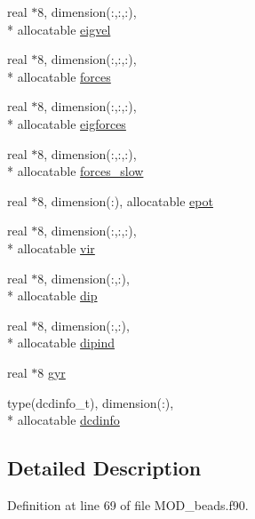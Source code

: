 \begin{DoxyCompactItemize}
\item 
real $\ast$8, dimension(\-:,\-:,\-:), \\*
allocatable \hyperlink{structbeads_1_1polymer__comm__type_a5b453aa1870a35c3b1ce3e84b8e2c6cb}{eigvel}
\item 
real $\ast$8, dimension(\-:,\-:,\-:), \\*
allocatable \hyperlink{structbeads_1_1polymer__comm__type_af9ab777fc9978966562ec6660fcf6eb3}{forces}
\item 
real $\ast$8, dimension(\-:,\-:,\-:), \\*
allocatable \hyperlink{structbeads_1_1polymer__comm__type_a8443614cb5015e9983dd6a6a8b8d730c}{eigforces}
\item 
real $\ast$8, dimension(\-:,\-:,\-:), \\*
allocatable \hyperlink{structbeads_1_1polymer__comm__type_a6614d7b1d87de7ddf82f98702d1d8e0c}{forces\-\_\-slow}
\item 
real $\ast$8, dimension(\-:), allocatable \hyperlink{structbeads_1_1polymer__comm__type_a729bf32d1b120205275265920cd5b3f9}{epot}
\item 
real $\ast$8, dimension(\-:,\-:,\-:), \\*
allocatable \hyperlink{structbeads_1_1polymer__comm__type_abf9384adaf528e1723461dd50d2a42ae}{vir}
\item 
real $\ast$8, dimension(\-:,\-:), \\*
allocatable \hyperlink{structbeads_1_1polymer__comm__type_abec558e15b37fe016d649919a75efc26}{dip}
\item 
real $\ast$8, dimension(\-:,\-:), \\*
allocatable \hyperlink{structbeads_1_1polymer__comm__type_a33b425bb71654a52b954f0771db35983}{dipind}
\item 
real $\ast$8 \hyperlink{structbeads_1_1polymer__comm__type_ae457aae2d6d4f839bb3edaad4cc13f58}{gyr}
\item 
type(dcdinfo\-\_\-t), dimension(\-:), \\*
allocatable \hyperlink{structbeads_1_1polymer__comm__type_aad5160b3d2116dcc351479cdfded5955}{dcdinfo}
\end{DoxyCompactItemize}


\subsection{Detailed Description}


Definition at line 69 of file M\-O\-D\-\_\-beads.\-f90.



